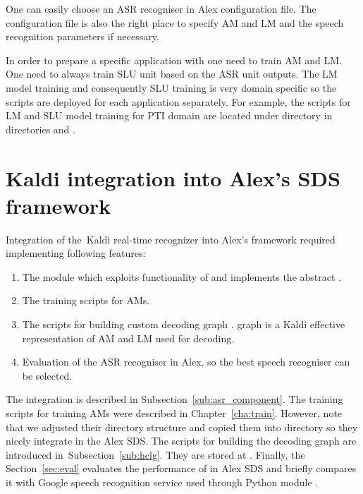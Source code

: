 One can easily choose an \ac{ASR} recogniser in Alex configuration file.
The configuration file is also the right place to specify \ac{AM} and \ac{LM} and the speech recognition parameters if necessary.

In order to prepare a specific application with  one need to train \ac{AM} and \ac{LM}.
One need to always train \ac{SLU} unit based on the \ac{ASR} unit outputs.
The \ac{LM} model training and consequently \ac{SLU} training is very domain specific so the scripts are deployed for each application separately.
For example, the scripts for \ac{LM} and \ac{SLU} model training for \ac{PTI} domain are located under directory  in directories  and .

\section[Kaldi integration into \acs{SDS} framework]{Kaldi integration into Alex's \acl{SDS} framework}
\label{sec:asrsds}

Integration of the~Kaldi real-time recognizer into Alex's framework required implementing following features:
\begin{enumerate}
    \item The  module which exploits functionality of  and implements the abstract .
    \item The training scripts for \aclp{AM}.
        \item The scripts for building custom decoding graph .  graph is a Kaldi effective representation of \ac{AM} and \ac{LM} used for decoding. 
    \item Evaluation of the \ac{ASR} recogniser in Alex, so the best speech recogniser can be selected.
\end{enumerate}

The  integration is described in Subsection~\ref{sub:asr_component}.
The training scripts for training \acp{AM} were described in Chapter~\ref{cha:train}.
However, note that we adjusted their directory structure and copied them into  directory so they nicely integrate in the Alex \ac{SDS}.
The scripts for building the  decoding graph are introduced in~Subsection~\ref{sub:hclg}.
They are stored at .
Finally, the Section~\ref{sec:eval} evaluates the performance of  in Alex \ac{SDS} and briefly compares it with Google speech recognition service used through Python module .

